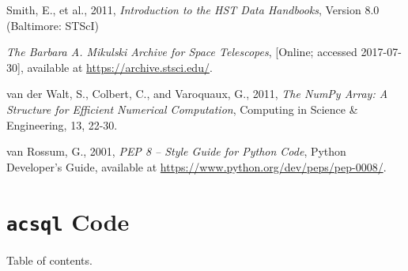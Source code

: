 \documentclass[10pt,journal,compsoc]{IEEEtran}
\begin{document}
\begin{thebibliography}{1}
Smith, E., et al., 2011, \emph{Introduction to the HST Data Handbooks}, Version 8.0 (Baltimore: STScI)

\emph{The Barbara A. Mikulski Archive for Space Telescopes}, [Online; accessed 2017-07-30],
available at \url{https://archive.stsci.edu/}.

van der Walt, S., Colbert, C., and Varoquaux, G., 2011, \emph{The NumPy Array: A Structure for
Efficient Numerical Computation}, Computing in Science \& Engineering, 13, 22-30.

van Rossum, G., 2001, \emph{PEP 8 -- Style Guide for Python Code}, Python Developer's Guide,
available at \url{https://www.python.org/dev/peps/pep-0008/}.

\end{thebibliography}



\onecolumn
\newpage
\appendices
\section{\texttt{acsql} Code}

Table of contents.
\end{document}
